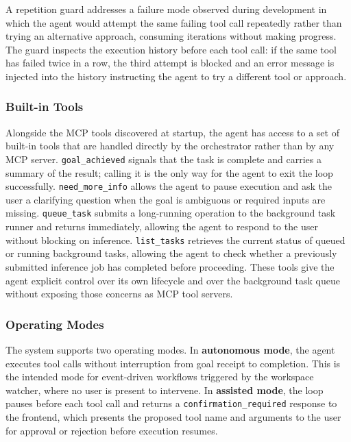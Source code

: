\documentclass[conference]{IEEEtran}
\begin{document}
A repetition guard addresses a failure mode observed during development in which the agent would attempt the same failing tool call repeatedly rather than trying an alternative approach, consuming iterations without making progress. The guard inspects the execution history before each tool call: if the same tool has failed twice in a row, the third attempt is blocked and an error message is injected into the history instructing the agent to try a different tool or approach.

\subsubsection{Built-in Tools}

Alongside the MCP tools discovered at startup, the agent has access to a set of built-in tools that are handled directly by the orchestrator rather than by any MCP server. \texttt{goal\_achieved} signals that the task is complete and carries a summary of the result; calling it is the only way for the agent to exit the loop successfully. \texttt{need\_more\_info} allows the agent to pause execution and ask the user a clarifying question when the goal is ambiguous or required inputs are missing. \texttt{queue\_task} submits a long-running operation to the background task runner and returns immediately, allowing the agent to respond to the user without blocking on inference. \texttt{list\_tasks} retrieves the current status of queued or running background tasks, allowing the agent to check whether a previously submitted inference job has completed before proceeding. These tools give the agent explicit control over its own lifecycle and over the background task queue without exposing those concerns as MCP tool servers.

\subsubsection{Operating Modes}

The system supports two operating modes. In \textbf{autonomous mode}, the agent executes tool calls without interruption from goal receipt to completion. This is the intended mode for event-driven workflows triggered by the workspace watcher, where no user is present to intervene.
In \textbf{assisted mode}, the loop pauses before each tool call and returns a \texttt{confirmation\_required} response to the frontend, which presents the proposed tool name and arguments to the user for approval or rejection before execution resumes.
\end{document}
